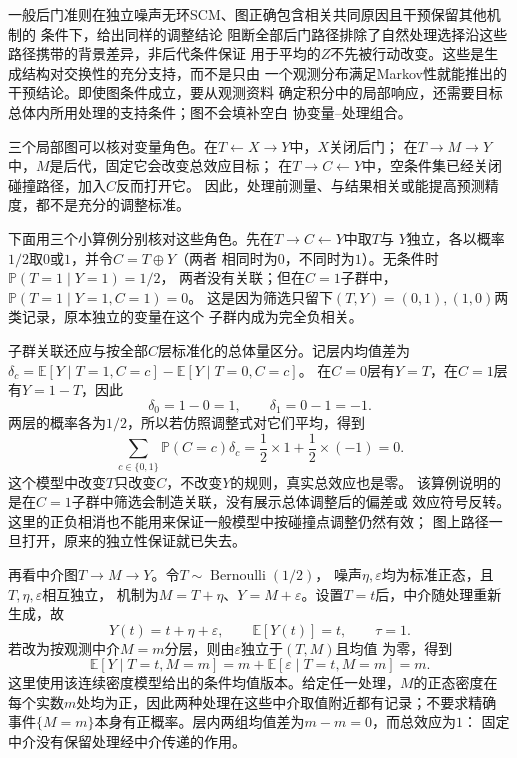 一般后门准则在独立噪声无环SCM、图正确包含相关共同原因且干预保留其他机制的
条件下，给出同样的调整结论
阻断全部后门路径排除了自然处理选择沿这些路径携带的背景差异，非后代条件保证
用于平均的\(Z\)不先被行动改变。这些是生成结构对交换性的充分支持，而不是只由
一个观测分布满足Markov性就能推出的干预结论。即使图条件成立，要从观测资料
确定积分中的局部响应，还需要目标总体内所用处理的支持条件；图不会填补空白
协变量--处理组合。

三个局部图可以核对变量角色。在\(T\leftarrow X\to Y\)中，\(X\)关闭后门；
在\(T\to M\to Y\)中，\(M\)是后代，固定它会改变总效应目标；
在\(T\to C\leftarrow Y\)中，空条件集已经关闭碰撞路径，加入\(C\)反而打开它。
因此，处理前测量、与结果相关或能提高预测精度，都不是充分的调整标准。

下面用三个小算例分别核对这些角色。先在\(T\to C\leftarrow Y\)中取\(T\)与
\(Y\)独立，各以概率\(1/2\)取\(0\)或\(1\)，并令\(C=T\oplus Y\)（两者
相同时为\(0\)，不同时为\(1\)）。无条件时\(\mathbb P(T=1\mid Y=1)=1/2\)，
两者没有关联；但在\(C=1\)子群中，\(\mathbb P(T=1\mid Y=1,C=1)=0\)。
这是因为筛选只留下\((T,Y)=(0,1),(1,0)\)两类记录，原本独立的变量在这个
子群内成为完全负相关。

子群关联还应与按全部\(C\)层标准化的总体量区分。记层内均值差为
\(\delta_c=\mathbb E[Y\mid T=1,C=c]-\mathbb E[Y\mid T=0,C=c]\)。
在\(C=0\)层有\(Y=T\)，在\(C=1\)层有\(Y=1-T\)，因此
\[
  \delta_0=1-0=1,\qquad \delta_1=0-1=-1.
\]
两层的概率各为\(1/2\)，所以若仿照调整式对它们平均，得到
\[
  \sum_{c\in\{0,1\}}\mathbb P(C=c)\delta_c
  =\frac12\times1+\frac12\times(-1)=0.
\]
这个模型中改变\(T\)只改变\(C\)，不改变\(Y\)的规则，真实总效应也是零。
该算例说明的是在\(C=1\)子群中筛选会制造关联，没有展示总体调整后的偏差或
效应符号反转。这里的正负相消也不能用来保证一般模型中按碰撞点调整仍然有效；
图上路径一旦打开，原来的独立性保证就已失去。

再看中介图\(T\to M\to Y\)。令\(T\sim\operatorname{Bernoulli}(1/2)\)，
噪声\(\eta,\varepsilon\)均为标准正态，且\(T,\eta,\varepsilon\)相互独立，
机制为\(M=T+\eta\)、\(Y=M+\varepsilon\)。设置\(T=t\)后，中介随处理重新
生成，故
\[
  Y(t)=t+\eta+\varepsilon,\qquad
  \mathbb E[Y(t)]=t,\qquad \tau=1.
\]
若改为按观测中介\(M=m\)分层，则由\(\varepsilon\)独立于\((T,M)\)且均值
为零，得到
\[
  \mathbb E[Y\mid T=t,M=m]
  =m+\mathbb E[\varepsilon\mid T=t,M=m]=m.
\]
这里使用该连续密度模型给出的条件均值版本。给定任一处理，\(M\)的正态密度在
每个实数\(m\)处均为正，因此两种处理在这些中介取值附近都有记录；不要求精确
事件\(\{M=m\}\)本身有正概率。层内两组均值差为\(m-m=0\)，而总效应为\(1\)：
固定中介没有保留处理经中介传递的作用。

